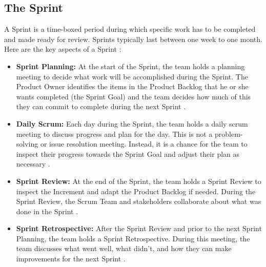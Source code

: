 \subsection{The Sprint}
A Sprint is a time-boxed period during which specific work has to be completed and made ready for review. Sprints typically last between one week to one month. Here are the key aspects of a Sprint \cite{scrum}:

\vspace{10pt}

\begin{itemize}
\item \textbf{Sprint Planning:} At the start of the Sprint, the team holds a planning meeting to decide what work will be accomplished during the Sprint. The Product Owner identifies the items in the Product Backlog that he or she wants completed (the Sprint Goal) and the team decides how much of this they can commit to complete during the next Sprint \cite{scrum}.
\item \textbf{Daily Scrum:} Each day during the Sprint, the team holds a daily scrum meeting to discuss progress and plan for the day. This is not a problem-solving or issue resolution meeting. Instead, it is a chance for the team to inspect their progress towards the Sprint Goal and adjust their plan as necessary \cite{scrum}.
\item \textbf{Sprint Review:} At the end of the Sprint, the team holds a Sprint Review to inspect the Increment and adapt the Product Backlog if needed. During the Sprint Review, the Scrum Team and stakeholders collaborate about what was done in the Sprint \cite{scrum}.
\item \textbf{Sprint Retrospective:} After the Sprint Review and prior to the next Sprint Planning, the team holds a Sprint Retrospective. During this meeting, the team discusses what went well, what didn't, and how they can make improvements for the next Sprint \cite{scrum}.
\end{itemize}
